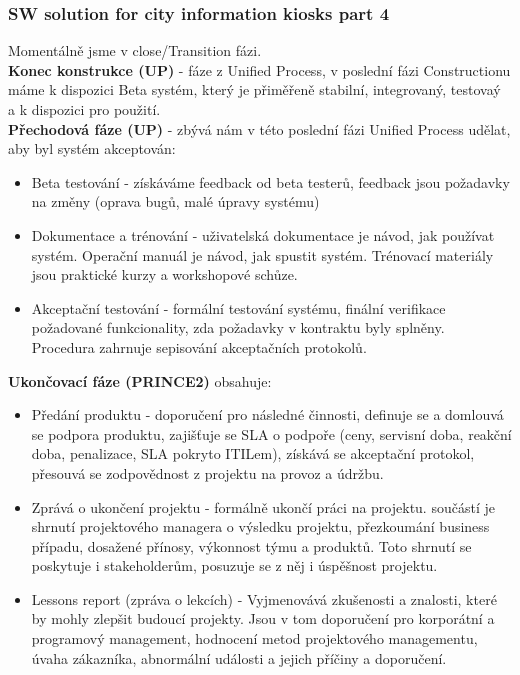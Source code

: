 \documentclass[11pt,a4paper]{article}
\begin{document}
    \subsubsection{SW solution for city information kiosks part 4 \cite{pres-9a}}
        Momentálně jsme v close/Transition fázi.\\
        \textbf{Konec konstrukce (UP)} - fáze z Unified Process, v poslední fázi Constructionu máme k dispozici Beta systém, který je přiměřeně stabilní, integrovaný, testovaý a k dispozici pro použití.\\
        \textbf{Přechodová fáze (UP)} - zbývá nám v této poslední fázi Unified Process udělat, aby byl systém akceptován:
        \begin{itemize}
            \item Beta testování - získáváme feedback od beta testerů, feedback jsou požadavky na změny (oprava bugů, malé úpravy systému)
            \item Dokumentace a trénování - uživatelská dokumentace je návod, jak používat systém. Operační manuál je návod, jak spustit systém. Trénovací materiály jsou praktické kurzy a workshopové schůze.
            \item Akceptační testování - formální testování systému, finální verifikace požadované funkcionality, zda požadavky v kontraktu byly splněny. Procedura zahrnuje sepisování akceptačních protokolů.
        \end{itemize}
        \textbf{Ukončovací fáze (PRINCE2)} obsahuje:
        \begin{itemize}
            \item Předání produktu - doporučení pro následné činnosti, definuje se a domlouvá se podpora produktu, zajišťuje se SLA o podpoře (ceny, servisní doba, reakční doba, penalizace, SLA pokryto ITILem), získává se akceptační protokol, přesouvá se zodpovědnost z projektu na provoz a údržbu.
            \item Zprává o ukončení projektu - formálně ukončí práci na projektu. součástí je shrnutí projektového managera o výsledku projektu, přezkoumání business případu, dosažené přínosy, výkonnost týmu a produktů. Toto shrnutí se poskytuje i stakeholderům, posuzuje se z něj i úspěšnost projektu.
            \item Lessons report (zpráva o lekcích) - Vyjmenovává zkušenosti a znalosti, které by mohly zlepšit budoucí projekty. Jsou v tom doporučení pro korporátní a programový management, hodnocení metod projektového managementu, úvaha zákazníka, abnormální události a jejich příčiny a doporučení.
        \end{itemize}
\end{document}

